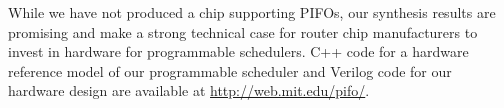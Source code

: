 While we have not produced a chip supporting PIFOs, our synthesis results are
promising and make a strong technical case for router chip manufacturers to
invest in hardware for programmable schedulers. C++ code for a hardware
reference model of our programmable scheduler and Verilog code for our hardware
design are available at \url{http://web.mit.edu/pifo/}.
